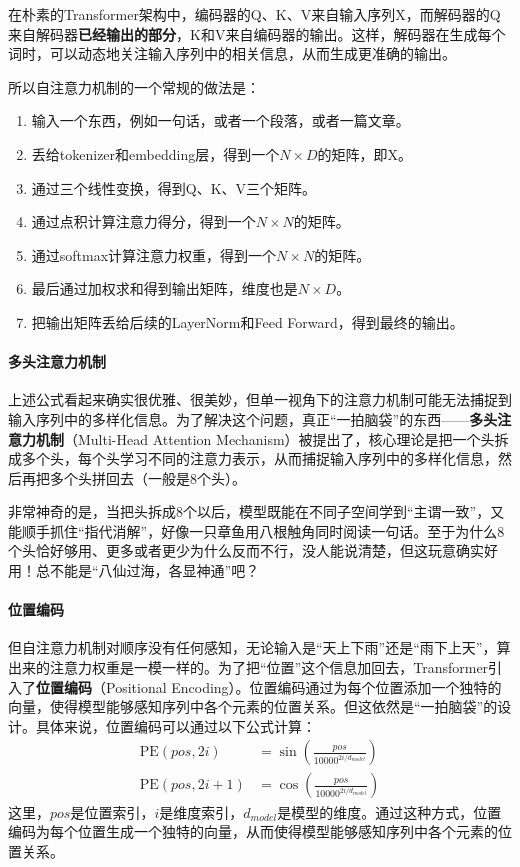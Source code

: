 在朴素的Transformer架构中，编码器的Q、K、V来自输入序列X，而解码器的Q来自解码器\textbf{已经输出的部分}，K和V来自编码器的输出。这样，解码器在生成每个词时，可以动态地关注输入序列中的相关信息，从而生成更准确的输出。

所以自注意力机制的一个常规的做法是：
\begin{enumerate}
    \item 输入一个东西，例如一句话，或者一个段落，或者一篇文章。
    \item 丢给tokenizer和embedding层，得到一个$N \times D$的矩阵，即X。
    \item 通过三个线性变换，得到Q、K、V三个矩阵。
    \item 通过点积计算注意力得分，得到一个$N \times N$的矩阵。
    \item 通过softmax计算注意力权重，得到一个$N \times N$的矩阵。
    \item 最后通过加权求和得到输出矩阵，维度也是$N \times D$。
    \item 把输出矩阵丢给后续的LayerNorm和Feed Forward，得到最终的输出。
\end{enumerate}

\paragraph{多头注意力机制}

上述公式看起来确实很优雅、很美妙，但单一视角下的注意力机制可能无法捕捉到输入序列中的多样化信息。为了解决这个问题，真正“一拍脑袋”的东西——\textbf{多头注意力机制}（Multi-Head Attention Mechanism）被提出了，核心理论是把一个头拆成多个头，每个头学习不同的注意力表示，从而捕捉输入序列中的多样化信息，然后再把多个头拼回去（一般是8个头）。

非常神奇的是，当把头拆成8个以后，模型既能在不同子空间学到“主谓一致”，又能顺手抓住“指代消解”，好像一只章鱼用八根触角同时阅读一句话。至于为什么8个头恰好够用、更多或者更少为什么反而不行，没人能说清楚，但这玩意确实好用！总不能是“八仙过海，各显神通”吧？

\paragraph{位置编码}

但自注意力机制对顺序没有任何感知，无论输入是“天上下雨”还是“雨下上天”，算出来的注意力权重是一模一样的。为了把“位置”这个信息加回去，Transformer引入了\textbf{位置编码}（Positional Encoding）。位置编码通过为每个位置添加一个独特的向量，使得模型能够感知序列中各个元素的位置关系。但这依然是“一拍脑袋”的设计。具体来说，位置编码可以通过以下公式计算：
\begin{align*}
\text{PE}(pos, 2i) &= \sin\left(\frac{pos}{10000^{2i/d_{model}}}\right) \\
\text{PE}(pos, 2i+1) &= \cos\left(\frac{pos}{10000^{2i/d_{model}}}\right)
\end{align*}
这里，$pos$是位置索引，$i$是维度索引，$d_{model}$是模型的维度。通过这种方式，位置编码为每个位置生成一个独特的向量，从而使得模型能够感知序列中各个元素的位置关系。

